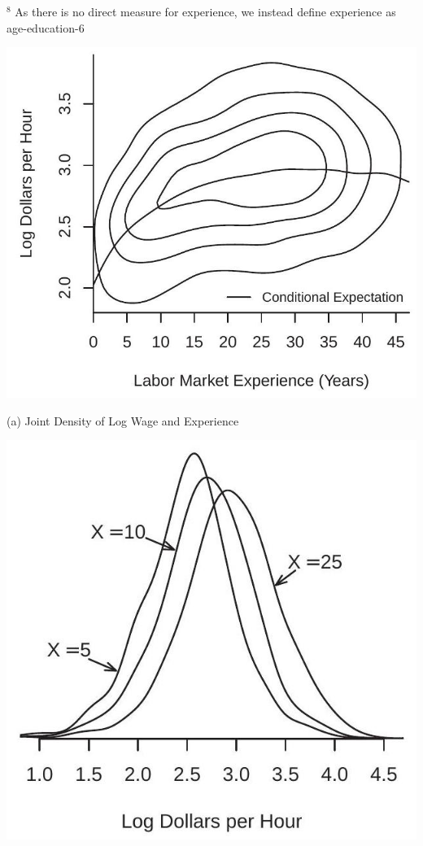 \documentclass[10pt]{article}
\begin{document}
${ }^{8}$ As there is no direct measure for experience, we instead define experience as age-education-6

\includegraphics[max width=\textwidth]{2022_09_17_efa0deee3441d06e0b66g-09}

(a) Joint Density of Log Wage and Experience

\includegraphics[max width=\textwidth]{2022_09_17_efa0deee3441d06e0b66g-09(1)}
\end{document}
